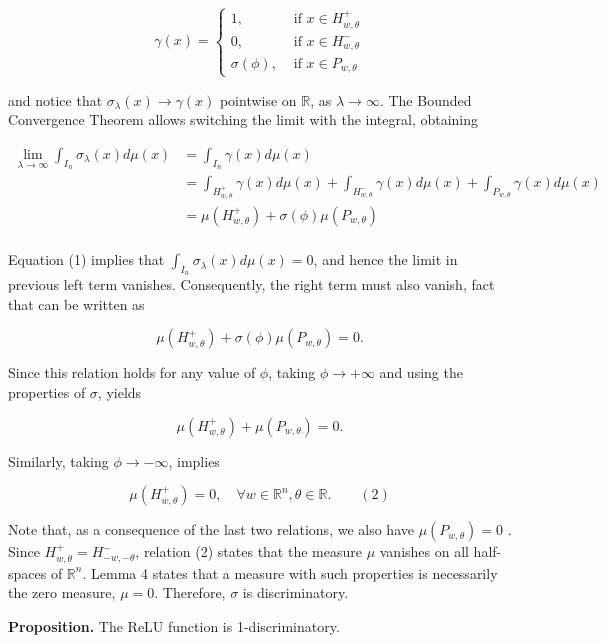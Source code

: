 $$
\gamma(x)=\left\{\begin{array}{ll}
1, & \text { if } x \in H_{w, \theta}^{+} \\
0, & \text { if } x \in H_{w, \theta}^{-} \\
\sigma(\phi), & \text { if } x \in P_{w, \theta}
\end{array}\right.
$$

and notice that $\sigma_\lambda(x) \rightarrow \gamma(x)$ pointwise on $\mathbb{R}$, as $\lambda \rightarrow \infty$. The Bounded Convergence Theorem allows switching the limit with the integral, obtaining

\[
    \begin{split}
        \lim _{\lambda \rightarrow \infty} \int_{I_n} \sigma_{\lambda}(x) d \mu(x) &=\int_{I_n} \gamma(x) d \mu(x) \\
&=\int_{H_{w, \theta}^{+}} \gamma(x) d \mu(x)+\int_{H_{w, \theta}^{-}} \gamma(x) d \mu(x)+\int_{P_{w, \theta}} \gamma(x)d\mu(x) \\
&=\mu\left(H_{w, \theta}^{+}\right)+\sigma(\phi) \mu\left(P_{w, \theta}\right)\\ 
    \end{split}
\]

Equation (1) implies that $\int_{I_n} \sigma_\lambda(x) d \mu(x)=0$, and hence the limit in previous left term vanishes. Consequently, the right term must also vanish, fact that can be written as

$$
\mu\left(H_{w, \theta}^{+}\right)+\sigma(\phi) \mu\left(P_{w, \theta}\right)=0.
$$

Since this relation holds for any value of $\phi$, taking $\phi \rightarrow+\infty$ and using the  properties of $\sigma$, yields

$$
\mu\left(H_{w, \theta}^{+}\right)+\mu\left(P_{w, \theta}\right)=0 .
$$

Similarly, taking $\phi \rightarrow-\infty$, implies

$$
\mu\left(H_{w, \theta}^{+}\right)=0, \quad \forall w \in \mathbb{R}^n, \theta \in \mathbb{R}. \qquad (2)
$$

Note that, as a consequence of the last two relations, we also have $\mu(P_{w,\theta})=0$ . Since $H_{w, \theta}^{+}=H_{-w,-\theta}^{-}$, relation (2) states that the measure $\mu$ vanishes on all half-spaces of $\mathbb{R}^n$. Lemma 4 states that a measure with such properties is necessarily the zero measure, $\mu=0$. Therefore, $\sigma$ is discriminatory.

\textbf{Proposition.} The ReLU function is 1-discriminatory.

